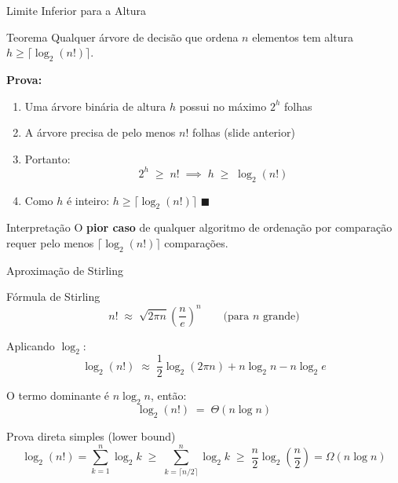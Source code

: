 \documentclass[aspectratio=169]{beamer}
\begin{document}
\begin{frame}[shrink=10]{Limite Inferior para a Altura}
  \begin{block}{Teorema}
    Qualquer árvore de decisão que ordena $n$ elementos tem altura $h \geq \lceil \log_2(n!) \rceil$.
  \end{block}

  \medskip
  \textbf{Prova:}
  \begin{enumerate}
    \item Uma árvore binária de altura $h$ possui no máximo $2^h$ folhas
    \item A árvore precisa de pelo menos $n!$ folhas (slide anterior)
    \item Portanto:
      \[
        2^h \;\geq\; n!
        \;\implies\;
        h \;\geq\; \log_2(n!)
      \]
    \item Como $h$ é inteiro: $h \geq \lceil \log_2(n!) \rceil$ \qquad $\blacksquare$
  \end{enumerate}

  \begin{alertblock}{Interpretação}
    O \textbf{pior caso} de qualquer algoritmo de ordenação por comparação requer
    pelo menos $\lceil \log_2(n!) \rceil$ comparações.
  \end{alertblock}
\end{frame}

\begin{frame}[shrink=5]{Aproximação de Stirling}
  \begin{block}{Fórmula de Stirling}
    \[
      n! \;\approx\; \sqrt{2\pi n}\left(\frac{n}{e}\right)^n
      \qquad \text{(para $n$ grande)}
    \]
  \end{block}

  \medskip
  Aplicando $\log_2$:
  \[
    \log_2(n!)
    \;\approx\;
    \frac{1}{2}\log_2(2\pi n) + n\log_2 n - n\log_2 e
  \]

  \medskip
  O termo dominante é $n \log_2 n$, então:
  \[
    \log_2(n!) \;=\; \Theta(n \log n)
  \]

  \begin{exampleblock}{Prova direta simples (lower bound)}
    \[
      \log_2(n!)
      = \sum_{k=1}^{n}\log_2 k
      \;\geq\;
      \sum_{k=\lceil n/2 \rceil}^{n}\log_2 k
      \;\geq\;
      \frac{n}{2}\log_2\!\left(\frac{n}{2}\right)
      = \Omega(n\log n)
    \]
  \end{exampleblock}
\end{frame}
\end{document}
